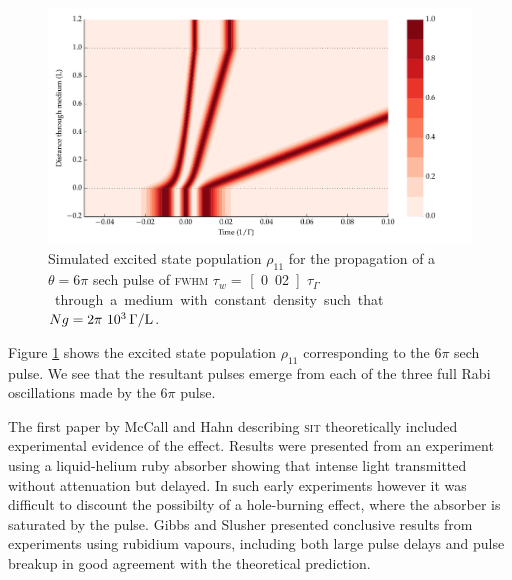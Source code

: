     \begin{figure}[]
      \includegraphics[width=\linewidth]
        {figs/03_nonlinear/coh_sech_6_0pi_fwhm0_020_Ng01000_fig3.pdf}
      \caption{
        Simulated excited state population $\rho_{11}$ for the propagation of a
        $\theta = 6\pi$ sech pulse of \textsc{fwhm} $\tau_w = $
        \unit[0.02]{$\tau_\Gamma$} through a medium with constant density such
        that $Ng = \unit[2\pi~10^3]{\Gamma/L}$.
      }
      \label{fig:sit_6pi_pop}
    \end{figure}

    Figure \ref{fig:sit_6pi_pop} shows the excited state population $\rho_{11}$
    corresponding to the $6\pi$ sech pulse. We see that the resultant pulses
    emerge from each of the three full Rabi oscillations made by the $6\pi$
    pulse.

    The first paper by McCall and Hahn describing \textsc{sit} theoretically
    included experimental evidence of the effect.\cite{McCall1969} Results were
    presented from an experiment using a liquid-helium ruby absorber showing
    that intense light transmitted without attenuation but delayed. In such
    early experiments however it was difficult to discount the possibilty of a
    hole-burning effect, where the absorber is saturated by the pulse. Gibbs and
    Slusher presented conclusive results from experiments using rubidium
    vapours,\cite{Slusher1972} including both large pulse delays and pulse
    breakup in good agreement with the theoretical prediction.
